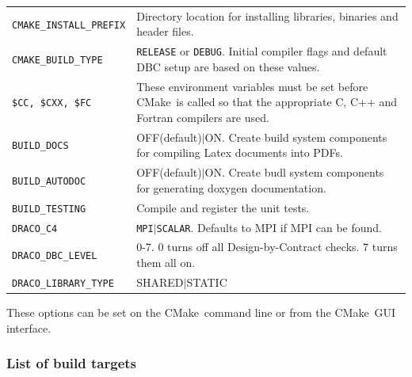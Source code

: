 \documentclass[note]{ResearchNote_pdf}
\newcommand{\cmake}{\textsf{CMake}}
\newcommand{\tableText}[1]{{\raggedright #1}}
\begin{document}
\begin{center}
  \footnotesize
  \begin{tabular}{lp{4.0in}}
    \hline\hline
    \texttt{CMAKE\_INSTALL\_PREFIX} & \tableText{Directory location for installing
      libraries, binaries and header files.} \\
    \texttt{CMAKE\_BUILD\_TYPE} & \tableText{\texttt{RELEASE} or
      \texttt{DEBUG}.  Initial compiler flags and default DBC setup
      are based on these values.} \\
    \texttt{\$CC, \$CXX, \$FC} & \tableText{These environment
      variables must be set before \cmake\ is called so that the
      appropriate C, C++ and Fortran compilers are used.} \\
\hline %
    \texttt{BUILD\_DOCS} & \tableText{OFF(default)$|$ON. Create build
      system components for compiling Latex documents into PDFs.} \\
    \texttt{BUILD\_AUTODOC} & \tableText{OFF(default)$|$ON. Create budl
      system components for generating doxygen\cite{doxygen}
      documentation.} \\
    \texttt{BUILD\_TESTING} & \tableText{Compile and register the unit
    tests.} \\
\hline %
    \texttt{DRACO\_C4} &
    \tableText{\texttt{MPI}$|$\texttt{SCALAR}.  Defaults to
      \textsf{MPI} if \textsf{MPI} can be found.} \\
    \texttt{DRACO\_DBC\_LEVEL} & \tableText{0-7. 0 turns off all
      Design-by-Contract checks. 7 turns them all on.} \\
    \texttt{DRACO\_LIBRARY\_TYPE} & \tableText{SHARED$|$STATIC} \\


    \hline\hline 
  \end{tabular}
\end{center}

These options can be set on the \cmake\ command line or from the
\cmake\ GUI interface.

\subsubsection{List of build targets}
\end{document}
